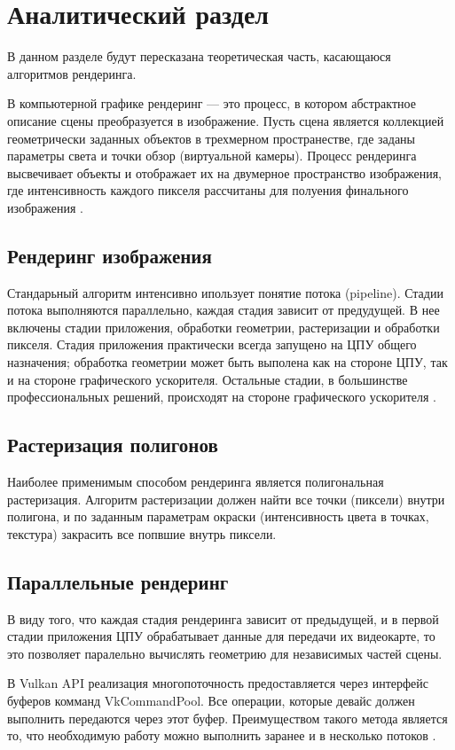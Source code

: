 \chapter{Аналитический раздел}
\label{cha:analysis}

В данном разделе будут пересказана теоретическая часть, касающаюся алгоритмов рендеринга.

В компьютерной графике рендеринг --- это процесс, в котором абстрактное описание сцены преобразуется в изображение. Пусть сцена является коллекцией геометрически заданных объектов в трехмерном пространестве, где заданы параметры света и точки обзор (виртуальной камеры). Процесс рендеринга высвечивает объекты и отображает их на двумерное пространство изображения, где интенсивность каждого пикселя рассчитаны для полуения финального изображения \cite{crockett1997introduction}.

\section{Рендеринг изображения}
Стандарьный алгоритм интенсивно ипользует понятие потока (pipeline). Стадии потока выполняются параллельно, каждая стадия зависит от предудущей. В нее включены стадии приложения, обработки геометрии, растеризации и обработки пикселя. Стадия приложения практически всегда запущено на ЦПУ общего назначения; обработка геометрии может быть выполена как на стороне ЦПУ, так и на стороне графического ускорителя. Остальные стадии, в большинстве профессиональных решений, происходят на стороне графического ускорителя \cite{akenine2019real}. 

\section{Растеризация полигонов}
Наиболее применимым способом рендеринга является полигональная растеризация. Алгоритм растеризации должен найти все точки (пиксели) внутри полигона, и по заданным параметрам окраски (интенсивность цвета в точках, текстура) закрасить все попвшие внутрь пиксели.

\section{Параллельные рендеринг}
В виду того, что каждая стадия рендеринга зависит от предыдущей, и в первой стадии приложения ЦПУ обрабатывает данные для передачи их видеокарте, то это позволяет паралельно вычислять геометрию для независимых частей сцены.

В Vulkan API \cite{vulkan_2021} реализация многопоточность предоставляется через интерфейс буферов комманд VkCommandPool. Все операции, которые девайс должен выполнить передаются через этот буфер. Преимуществом такого метода является то, что необходимую работу можно выполнить заранее и в несколько потоков \cite{sellers2016vulkan}.


